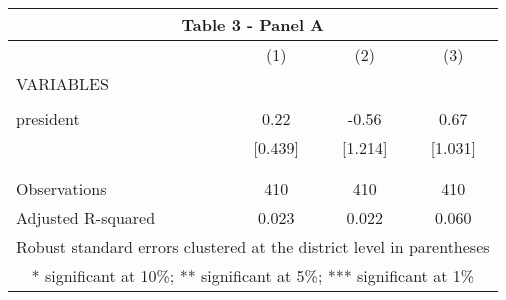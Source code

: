 \begin{tabular}{lccc}
\multicolumn{4}{c}{Table 3 - Panel A} \\ \hline
 & (1) & (2) & (3) \\
VARIABLES &  &  &  \\ \hline
 &  &  &  \\
president & 0.22 & -0.56 & 0.67 \\
 & [0.439] & [1.214] & [1.031] \\
 &  &  &  \\
 &  &  &  \\
Observations & 410 & 410 & 410 \\
 Adjusted R-squared & 0.023 & 0.022 & 0.060 \\ \hline
\multicolumn{4}{c}{ Robust standard errors clustered at the district level in parentheses} \\
\multicolumn{4}{c}{ * significant at 10\%; ** significant at 5\%; *** significant at 1\%} \\
\end{tabular}
